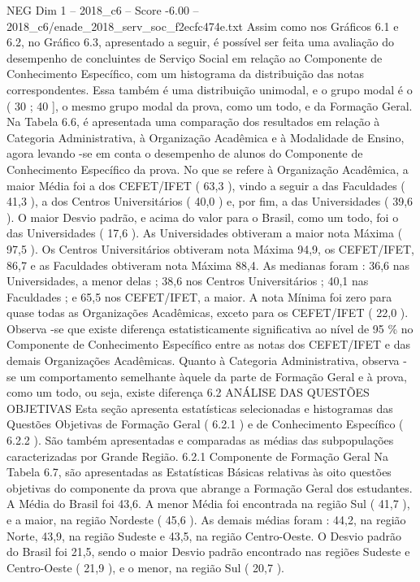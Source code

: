 \begin{textsample}{NEG Dim 1 – 2018\_c6 – Score -6.00 – 2018\_c6/enade\_2018\_serv\_soc\_f2ecfc474e.txt}
Assim como nos Gráficos 6.1 e 6.2, no Gráfico 6.3, apresentado a seguir, é possível ser feita uma avaliação do desempenho de concluintes de Serviço Social em relação ao Componente de Conhecimento Específico, com um histograma da distribuição das notas correspondentes.
Essa também é uma distribuição unimodal, e o grupo modal é o ( 30 ; 40 ], o mesmo grupo modal da prova, como um todo, e da Formação Geral.
Na Tabela 6.6, é apresentada uma comparação dos resultados em relação à Categoria Administrativa, à Organização Acadêmica e à Modalidade de Ensino, agora levando -se em conta o desempenho de alunos do Componente de Conhecimento Específico da prova.
No que se refere à Organização Acadêmica, a maior Média foi a dos CEFET/IFET ( 63,3 ), vindo a seguir a das Faculdades ( 41,3 ), a dos Centros Universitários ( 40,0 ) e, por fim, a das Universidades ( 39,6 ).
O maior Desvio padrão, e acima do valor para o Brasil, como um todo, foi o das Universidades ( 17,6 ).
As Universidades obtiveram a maior nota Máxima ( 97,5 ).
Os Centros Universitários obtiveram nota Máxima 94,9, os CEFET/IFET, 86,7 e as Faculdades obtiveram nota Máxima 88,4.
As medianas foram : 36,6 nas Universidades, a menor delas ; 38,6 nos Centros Universitários ; 40,1 nas Faculdades ; e 65,5 nos CEFET/IFET, a maior.
A nota Mínima foi zero para quase todas as Organizações Acadêmicas, exceto para os CEFET/IFET ( 22,0 ).
Observa -se que existe diferença estatisticamente significativa ao nível de 95 \% no Componente de Conhecimento Específico entre as notas dos CEFET/IFET e das demais Organizações Acadêmicas.
Quanto à Categoria Administrativa, observa -se um comportamento semelhante àquele da parte de Formação Geral e à prova, como um todo, ou seja, existe diferença 6.2 ANÁLISE DAS QUESTÕES OBJETIVAS Esta seção apresenta estatísticas selecionadas e histogramas das Questões Objetivas de Formação Geral ( 6.2.1 ) e de Conhecimento Específico ( 6.2.2 ).
São também apresentadas e comparadas as médias das subpopulações caracterizadas por Grande Região. 6.2.1 Componente de Formação Geral Na Tabela 6.7, são apresentadas as Estatísticas Básicas relativas às oito questões objetivas do componente da prova que abrange a Formação Geral dos estudantes.
A Média do Brasil foi 43,6.
A menor Média foi encontrada na região Sul ( 41,7 ), e a maior, na região Nordeste ( 45,6 ).
As demais médias foram : 44,2, na região Norte, 43,9, na região Sudeste e 43,5, na região Centro-Oeste.
O Desvio padrão do Brasil foi 21,5, sendo o maior Desvio padrão encontrado nas regiões Sudeste e Centro-Oeste ( 21,9 ), e o menor, na região Sul ( 20,7 ).

\end{textsample}

